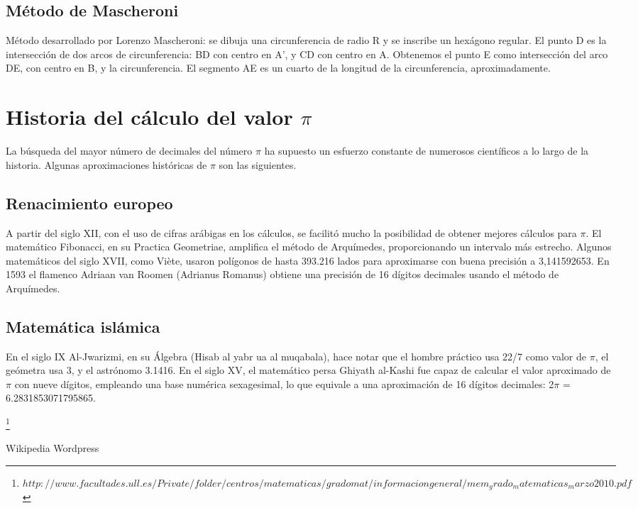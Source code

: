 \documentclass[spanish,a4paper,11pt]{article}
\begin{document}
\subsection {Método de Mascheroni}

Método desarrollado por Lorenzo Mascheroni: se dibuja una circunferencia de radio R y se inscribe un hexágono regular. El punto D es la intersección de dos arcos de circunferencia: BD con centro en A', y CD con centro en A. Obtenemos el punto E como intersección del arco DE, con centro en B, y la circunferencia. El segmento AE es un cuarto de la longitud de la circunferencia, aproximadamente.

\section {Historia del cálculo del valor $\pi$}

La búsqueda del mayor número de decimales del número $\pi$ ha supuesto un esfuerzo constante de numerosos científicos a lo largo de la historia. Algunas aproximaciones históricas de $\pi$ son las siguientes.\cite{Wiki}

\subsection{Renacimiento europeo}

A partir del siglo XII, con el uso de cifras arábigas en los cálculos, se facilitó mucho la posibilidad de obtener mejores cálculos para $\pi$. El matemático Fibonacci, en su Practica Geometriae, amplifica el método de Arquímedes, proporcionando un intervalo más estrecho. Algunos matemáticos del siglo XVII, como Viète, usaron polígonos de hasta 393.216 lados para aproximarse con buena precisión a 3,141592653. En 1593 el flamenco Adriaan van Roomen (Adrianus Romanus) obtiene una precisión de 16 dígitos decimales usando el método de Arquímedes.
\subsection{Matemática islámica}

En el siglo IX Al-Jwarizmi, en su Álgebra (Hisab al yabr ua al muqabala), hace notar que el hombre práctico usa 22/7 como valor de $\pi$, el geómetra usa 3, y el astrónomo 3.1416. En el siglo XV, el matemático persa Ghiyath al-Kashi fue capaz de calcular el valor aproximado de $\pi$ con nueve dígitos, empleando una base numérica sexagesimal, lo que equivale a una aproximación de 16 dígitos decimales: 2$\pi$ = 6.2831853071795865.

\footnote{$http://www.facultades.ull.es/Private/folder/centros/matematicas/gradomat/informaciongeneral/mem_grado_matematicas_marzo2010.pdf$}

\begin{thebibliography}{99}
Wikipedia
Wordpress\\
\end{thebibliography}
\end{document}
